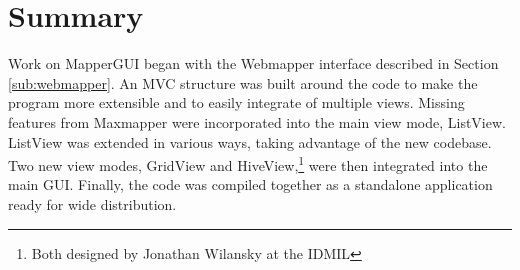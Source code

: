 

\section{Summary} %
\label{sec:design_summary}

Work on MapperGUI began with the Webmapper interface described in Section \ref{sub:webmapper}. An MVC structure was built around the code to make the program more extensible and to easily integrate of multiple views. Missing features from Maxmapper were incorporated into the main view mode, ListView. ListView was extended in various ways, taking advantage of the new codebase. Two new view modes, GridView and HiveView,\footnote{Both designed by Jonathan Wilansky at the IDMIL} were then integrated into the main GUI. Finally, the code was compiled together as a standalone application ready for wide distribution.





